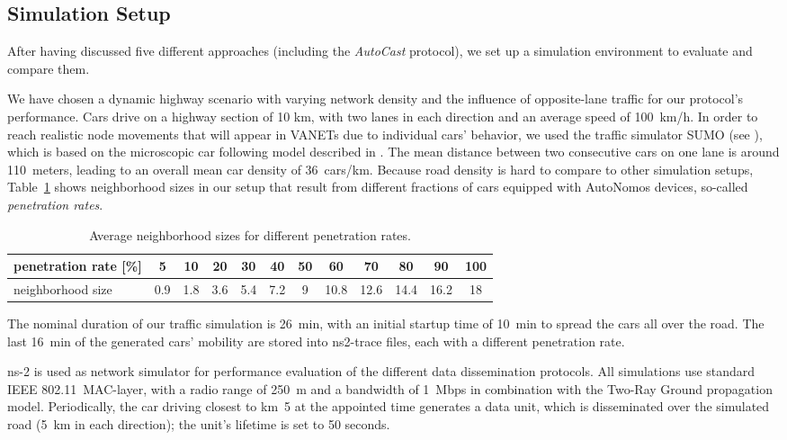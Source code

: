 \documentclass{acmrip}
\newcommand{\tabref}[1]{Table~\ref{tab:#1}}
\begin{document}
\subsection{Simulation Setup}
\label{sec:setup}


After having discussed five different approaches (including the
\textit{AutoCast} protocol), we set up a simulation environment to
evaluate and compare them.

We have chosen a dynamic highway scenario with varying
network density and the influence of opposite-lane traffic for our
protocol's performance. Cars drive on a highway section of 10 km, 
with two lanes in each direction and an average speed of
100~km/h. In order to reach realistic node movements that will
appear in VANETs due to individual cars' behavior, we used
the traffic simulator SUMO (see \cite{Krajzewicz_et_al2002_1}),
which is based on the microscopic car following model described in
\cite{k-mmtfi-97}. The mean distance between two consecutive cars on
one lane is around 110~meters, leading to an overall
mean car density of 36~cars/km. Because road density is hard to
compare to other simulation setups, \tabref{car_density} shows
neighborhood sizes in our setup that result from different fractions
of cars equipped with AutoNomos devices, so-called {\em penetration
rates}.


\begin{table}[tp]
\setlength{\tabcolsep}{0.81mm}
\caption{\small Average neighborhood sizes for different penetration
rates.} \label{tab:car_density} \centering
\begin{tabular}{|l|c|c|c|c|c|c|c|c|c|c|c|}
\hline
penetration rate [\%] & 5 & 10 & 20 & 30 & 40 & 50 & 60 & 70 & 80 & 90 & 100 \\
\hline
neighborhood size & 0.9 & 1.8 & 3.6 & 5.4 & 7.2 & 9 & 10.8 & 12.6 & 14.4 & 16.2 & 18 \\
\hline
\end{tabular}
\end{table}

The nominal duration of our traffic simulation is 26~min, with an
initial startup time of 10~min to spread the cars all over the road.
The last 16~min of the generated cars' mobility are stored into
ns2-trace files, each with a different penetration rate.

ns-2 \cite{ns2} is used as network simulator for performance
evaluation of the different data dissemination protocols. All
simulations use standard IEEE 802.11~MAC-layer, with a radio range
of 250~m and a bandwidth of 1~Mbps in combination with the Two-Ray
Ground propagation model. Periodically, the car driving closest to
km~5 at the appointed time generates a data unit, which is disseminated
over the simulated road (5~km in each direction); the unit's lifetime
is set to 50 seconds.
\end{document}
